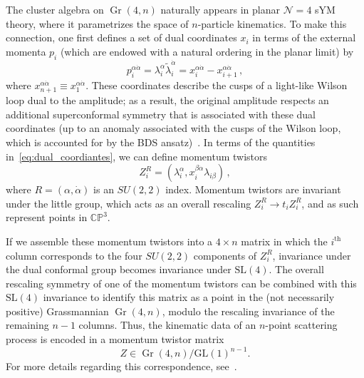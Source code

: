 \documentclass[12pt]{article}
\DeclareMathOperator{\Gr}{Gr}
\begin{document}
The cluster algebra on $\Gr(4,n)$ naturally appears in planar $\mathcal{N}=4$ sYM theory, where it parametrizes the space of $n$-particle kinematics. To make this connection, one first defines a set of dual coordinates $x_i$ in terms of the external momenta $p_i$ (which are endowed with a natural ordering in the planar limit) by
\begin{equation}
p_i^{\alpha \dot \alpha} = \lambda_i^\alpha \tilde \lambda_i^{\dot \alpha} = x_i^{\alpha \dot \alpha} - x_{i+1}^{\alpha \dot \alpha} \, , \label{eq:dual_coordiantes}
\end{equation}
where $x_{n+1}^{\alpha \dot \alpha} \equiv x_1^{\alpha \dot \alpha}$. These coordinates describe the cusps of a light-like Wilson loop dual to the amplitude; as a result, the original amplitude respects an additional superconformal symmetry that is associated with these dual coordinates (up to an anomaly associated with the cusps of the Wilson loop, which is accounted for by the BDS ansatz)~\cite{Bern:2005iz,Drummond:2007au,Bern:2008ap,Drummond:2008aq,Drummond:2006rz,Bern:2006ew,Bern:2007ct,Alday:2007hr,Drummond:2008vq}. In terms of the quantities in~\eqref{eq:dual_coordiantes}, we can define momentum twistors 
\begin{equation}
Z^R_i = (\lambda_i^\alpha, x_i^{\beta \dot \alpha} \lambda_{i \beta}) \, ,
\end{equation}
where $R = (\alpha, \dot \alpha)$ is an $SU(2,2)$ index. Momentum twistors are invariant under the little group, which acts as an overall rescaling $Z_i^R \rightarrow  t_i Z_i^R$, and as such represent points in $\mathbb{CP}^3$. 

If we assemble these momentum twistors into a $4 \times n$ matrix in which the $i^\text{th}$ column corresponds to the four $SU(2,2)$ components of $Z_i^R$, invariance under the dual conformal group becomes invariance under $\text{SL}(4)$. The overall rescaling symmetry of one of the momentum twistors can be combined with this $\text{SL}(4)$ invariance to identify this matrix as a point in the (not necessarily positive) Grassmannian $\Gr(4,n)$, modulo the rescaling invariance of the remaining $n-1$ columns. Thus, the kinematic data of an $n$-point scattering process is encoded in a momentum twistor matrix
\begin{equation}
Z \in \Gr(4,n)/\text{GL}(1)^{n-1}. \label{eq:gr4n_momentum_twistor}
\end{equation}
For more details regarding this correspondence, see~\cite{ArkaniHamed:2012nw,Golden:2013xva}. 
\end{document}
